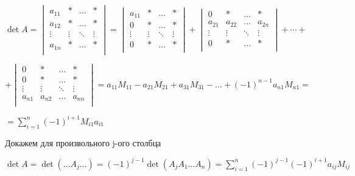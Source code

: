 \documentclass[twoside]{book}
\begin{document}
\begin{enumerate}
          \(\det A =
          \begin{vmatrix}
              a_{11} & *      & \ldots & *      \\
              a_{12} & *      & \ldots & *      \\
              \vdots & \vdots & \ddots & \vdots \\
              a_{1n} & *      & \ldots & *      \\
          \end{vmatrix} =
          \begin{vmatrix}
              a_{11} & *      & \ldots & *      \\
              0      & *      & \ldots & *      \\
              \vdots & \vdots & \ddots & \vdots \\
              0      & *      & \ldots & *      \\
          \end{vmatrix} +
          \begin{vmatrix}
              0      & *      & \ldots & *      \\
              a_{21} & a_{22} & \ldots & a_{2n} \\
              \vdots & \vdots & \ddots & \vdots \\
              0      & *      & \ldots & *      \\
          \end{vmatrix} + \cdots +\)

          \(+
          \begin{vmatrix}
              0      & *      & \ldots & *      \\
              0      & *      & \ldots & *      \\
              \vdots & \vdots & \ddots & \vdots \\
              a_{n1} & a_{n2} & \ldots & a_{nn} \\
          \end{vmatrix} = a_{11} M_{11} - a_{21} M_{21} + a_{31} M_{31} - \ldots + (-1)^{n-1} a_{n1} M_{n1} =\)

          \(= \sum\limits_{i = 1}^n (-1)^{i + 1} M_{i1} a_{i1}\)


          Докажем для произвольного j-ого столбца

          \(\det A = \det (\ldots A_j \ldots) = (-1)^{j-1} \det (A_j A_1 \ldots A_n) = \sum\limits_{i=1}^n(-1)^{j-1}(-1)^{i+1} a_{ij} M_{ij}\)





\end{enumerate}
\end{document}
